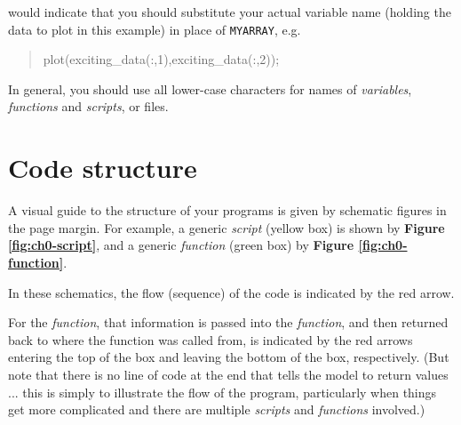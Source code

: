 \documentclass{tufte-book} %
\newenvironment{docspec}{\begin{quotation}\ttfamily\parskip0pt\parindent0pt\ignorespaces}{\end{quotation}}
\begin{document}
\noindent would indicate that you should substitute your actual variable name (holding the data to plot in this example) in place of \texttt{MYARRAY}, e.g.

\begin{docspec}
plot(exciting\_data(:,1),exciting\_data(:,2));
\end{docspec}  

In general, you should use all lower-case characters for names of \textit{variables}, \textit{functions} and \textit{scripts}, or files.
 

\section{Code structure}

A visual guide to the structure of your programs is given by schematic figures in the page margin. For example, a generic \textit{script} (yellow box) is shown by \textbf{Figure \ref{fig:ch0-script}}, and a generic \textit{function} (green box) by \textbf{Figure \ref{fig:ch0-function}}. 

In these schematics, the flow (sequence) of the code is indicated by the red arrow. 

For the \textit{function}, that information is passed into the \textit{function}, and then returned back to where the function was called from, is indicated by the red arrows entering the top of the box and leaving the bottom of the box, respectively. (But note that there is no line of code at the end that tells the model to return values ... this is simply to illustrate the flow of the program, particularly when things get more complicated and there are multiple \textit{scripts} and \textit{functions} involved.)
\end{document}
